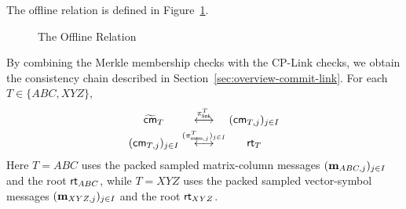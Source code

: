 The offline relation is defined in Figure~\ref{relation:lamp-off}.

\begin{figure}[!t]
\begin{tcolorbox}[colback=white, colframe=black]
\end{tcolorbox}
\caption{The Offline Relation}
\label{relation:lamp-off}
\end{figure}
\FloatBarrier

By combining the Merkle membership checks with the CP-Link checks, we obtain the consistency chain described in Section~\ref{sec:overview-commit-link}.
For each \(T\in\{ABC,XYZ\}\),
\[
\begin{array}{c@{\;}c@{\;}c}
\widetilde{\cm}_{T}
&
\overset{\pi_{\mathsf{link}}^{T}}{\longleftrightarrow}
&
(\cm_{T,j})_{j\in I}
\\[0.6ex]
(\cm_{T,j})_{j\in I}
&
\overset{(\pi_{\mathsf{mem},j}^{T})_{j\in I}}{\longleftrightarrow}
&
\rt_T
\end{array}
\]
Here \(T=ABC\) uses the packed sampled matrix-column messages
\((\mathbf{m}_{ABC,j})_{j\in I}\) and the root \(\textsf{rt}_{ABC}\), while \(T=XYZ\)
uses the packed sampled vector-symbol messages
\((\mathbf{m}_{XYZ,j})_{j\in I}\) and the root \(\textsf{rt}_{XYZ}\).

